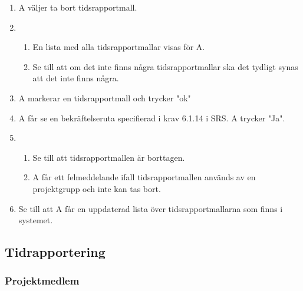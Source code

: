 \documentclass[a4paper]{article}
\begin{document}
\begin{ST}
\begin{enumerate}
\item A väljer ta bort tidsrapportmall.
\item 
\begin{enumerate}
\item En lista med alla tidsrapportmallar visas för A.
\item Se till att om det inte finns några tidsrapportmallar ska det tydligt synas att det inte finns några.
\end{enumerate}
\item A markerar en tidsrapportmall och trycker "ok"
\item A får se en bekräftelseruta specifierad i krav 6.1.14 i SRS. A trycker "Ja".
\item
\begin{enumerate}
\item Se till att tidsrapportmallen är borttagen.
\item A får ett felmeddelande ifall tidsrapportmallen används av en projektgrupp och inte kan tas bort.
\end{enumerate}
\item Se till att A får en uppdaterad lista över tidsrapportmallarna som finns i systemet.
\end{enumerate}

\end{ST}




\subsection{Tidrapportering}
\subsubsection{Projektmedlem}
\end{document}
